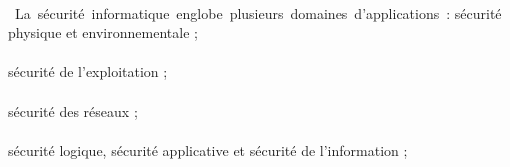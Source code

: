 \paragraph{ }
\hbox{ La sécurité informatique englobe plusieurs domaines d'applications :}
\vspace{5mm}
\textendash \space   sécurité physique et environnementale ;
\paragraph{ }
\textendash \space   sécurité de l’exploitation ;
\paragraph{ }
\textendash \space  sécurité des réseaux ;
\paragraph{ }
\textendash \space  sécurité logique, sécurité applicative et sécurité de l’information ;
